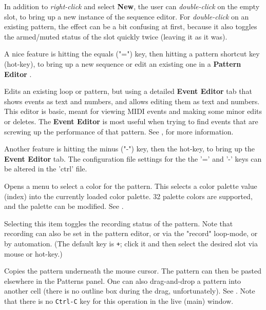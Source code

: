   In addition to \textsl{right-click} and select \textbf{New}, the user can
   \textsl{double-click} on the empty slot,
   to bring up a new instance of the sequence
   editor.  For \textsl{double-click} on an existing pattern,
   the effect can be a bit confusing at first,
   because it also toggles the armed/muted status of the slot
   quickly twice (leaving it as it was).


   A nice feature is hitting the equals ("=") key, then hitting
   a pattern shortcut key (hot-key), to bring up a new sequence or edit an
   existing one in a \textbf{Pattern Editor} .

   Edits an existing loop or pattern, but using a detailed \textbf{Event Editor}
   tab that shows events as text and numbers, and allows editing them as text
   and numbers.
   This editor is basic, meant for viewing
   MIDI events and making some minor edits or deletes.
   The \textbf{Event Editor} is most useful when trying to find events
   that are screwing up the performance of that pattern.
   See , for more information.

   Another feature is hitting the minus
   ("-") key, then the hot-key, to bring up the \textbf{Event Editor} tab.
   The configuration file settings for the the '=' and
   '-' keys can be altered in the 'ctrl' file.

   Opens a menu to select a color for the pattern.  This selects a color
   palette value (index) into the currently loaded color palette.
   32 palette colors are supported, and the palette can be modified.
   See .

   Selecting this item toggles the recording status of the pattern.
   Note that recording can also be set in the pattern editor, or via
   the "record" loop-mode, or by automation.
   (The default key is \texttt{+}; click it and then select the
   desired slot via mouse or hot-key.)

   Copies the pattern underneath the mouse cursor.
   The pattern can then be pasted elsewhere in the Patterns panel.
   One can also drag-and-drop a pattern into another cell (there is no outline
   box during the drag, unfortunately).
   See .
   Note that there is no \texttt{Ctrl-C} key for this operation in the
   live (main) window.

